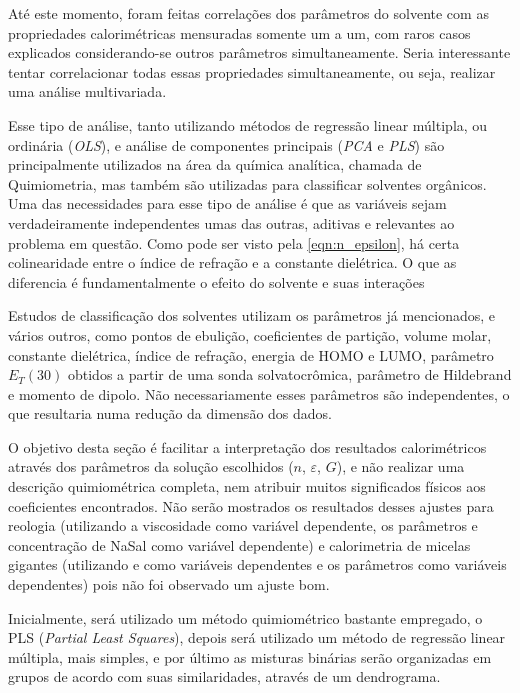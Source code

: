 		Até este momento, foram feitas correlações dos parâmetros do solvente com as propriedades calorimétricas mensuradas somente um a um, com raros casos explicados considerando-se outros parâmetros simultaneamente. Seria interessante tentar correlacionar todas essas propriedades simultaneamente, ou seja, realizar uma análise multivariada.
		
		Esse tipo de análise, tanto utilizando métodos de regressão linear múltipla, ou ordinária (\emph{OLS}), e análise de componentes principais (\emph{PCA} e \emph{PLS}) são principalmente utilizados na área da química analítica, chamada de Quimiometria, mas também são utilizadas para classificar solventes orgânicos. %
		Uma das necessidades para esse tipo de análise é que as variáveis sejam verdadeiramente independentes umas das outras, aditivas e relevantes ao problema em questão. Como pode ser visto pela \autoref{eqn:n_epsilon}, há certa colinearidade entre o índice de refração e a constante dielétrica. O que as diferencia é fundamentalmente o efeito do solvente e suas interações %
		
		Estudos de classificação dos solventes utilizam os parâmetros já mencionados, e vários outros, como pontos de ebulição, coeficientes de partição, volume molar, constante dielétrica, índice de refração, energia de HOMO e LUMO, parâmetro \(E_T(30)\) obtidos a partir de uma sonda solvatocrômica, parâmetro de Hildebrand e momento de dipolo. %
		Não necessariamente esses parâmetros são independentes, o que resultaria numa redução da dimensão dos dados.
		
		O objetivo desta seção é facilitar a interpretação dos resultados calorimétricos através dos parâmetros da solução escolhidos (\(n\), \(\varepsilon\), \(G\)), e não realizar uma descrição quimiométrica completa, nem atribuir muitos significados físicos aos coeficientes encontrados. Não serão mostrados os resultados desses ajustes para reologia (utilizando a viscosidade como variável dependente, os parâmetros e concentração de NaSal como variável dependente) e calorimetria de micelas gigantes (utilizando \cwlm{} e \DHwlm{} como variáveis dependentes e os parâmetros como variáveis dependentes) pois não foi observado um ajuste bom.
		
		Inicialmente, será utilizado um método quimiométrico bastante empregado, o PLS (\emph{Partial Least Squares}), depois será utilizado um método de regressão linear múltipla, mais simples, e por último as misturas binárias serão organizadas em grupos de acordo com suas similaridades, através de um dendrograma.
		
